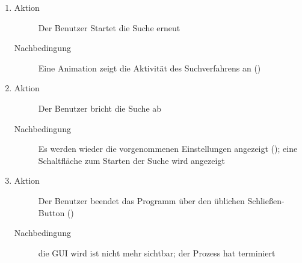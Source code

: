\begin{description}
\begin{enumerate}
		\item
		\begin{description}
			\item[Aktion] Der Benutzer Startet die Suche erneut
			\item[Nachbedingung] Eine Animation zeigt die Aktivität des Suchverfahrens an ()
		\end{description}
		\item
		\begin{description}
			\item[Aktion] Der Benutzer bricht die Suche ab
			\item[Nachbedingung] Es werden wieder die vorgenommenen Einstellungen angezeigt (); eine Schaltfläche zum Starten der Suche wird angezeigt
		\end{description}
		\item
		\begin{description}
			\item[Aktion] Der Benutzer beendet das Programm über den üblichen Schließen-Button ()
			\item[Nachbedingung] die GUI wird ist nicht mehr sichtbar; der Prozess hat terminiert
		\end{description}
	\end{enumerate}


\end{description}
